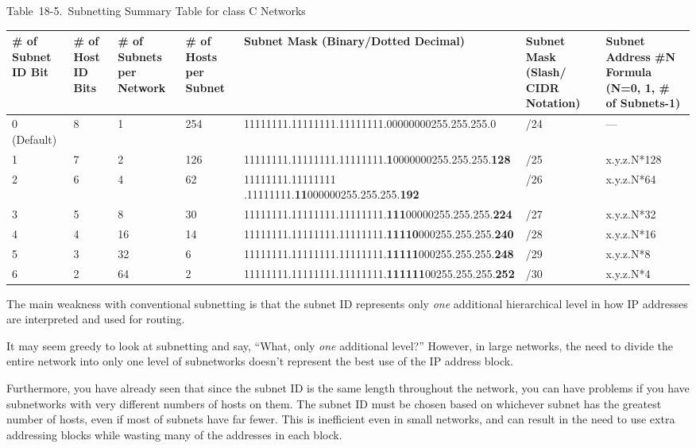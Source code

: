 \protect\hypertarget{ch18s07.htmlux5cux23subnetting_summary_table_for_class_c_net}{}{}

Table~18-5.~Subnetting Summary Table for class C Networks

\begin{longtable}[]{@{}lllllll@{}}
\toprule
\# of Subnet ID Bit & \# of Host ID Bits & \# of Subnets per Network &
\# of Hosts per Subnet & Subnet Mask (Binary/Dotted Decimal) & Subnet
Mask (Slash/ CIDR Notation) & Subnet Address \#N Formula (N=0, 1, \# of
Subnets-1)\tabularnewline
\midrule
\endhead
0 (Default) & 8 & 1 & 254 &
11111111.11111111.11111111.00000000255.255.255.0 & /24 &
---\tabularnewline
1 & 7 & 2 & 126 &
11111111.11111111.11111111.{\textbf{1}}0000000255.255.255.{\textbf{128}}
& /25 & x.y.z.N*128\tabularnewline
2 & 6 & 4 & 62 & 11111111.11111111
.11111111.{\textbf{11}}000000255.255.255.{\textbf{192}} & /26 &
x.y.z.N*64\tabularnewline
3 & 5 & 8 & 30 &
11111111.11111111.11111111.{\textbf{111}}00000255.255.255.{\textbf{224}}
& /27 & x.y.z.N*32\tabularnewline
4 & 4 & 16 & 14 &
11111111.11111111.11111111.{\textbf{11110}}000255.255.255.{\textbf{240}}
& /28 & x.y.z.N*16\tabularnewline
5 & 3 & 32 & 6 &
11111111.11111111.11111111.{\textbf{11111}}000255.255.255.{\textbf{248}}
& /29 & x.y.z.N*8\tabularnewline
6 & 2 & 64 & 2 &
11111111.11111111.11111111.{\textbf{111111}}00255.255.255.{\textbf{252}}
& /30 & x.y.z.N*4\tabularnewline
\bottomrule
\end{longtable}

\protect\hypertarget{ch18s08.html}{}{}

\protect\hypertarget{ch18s08.htmlux5cux23idx-CHP-18-0742}{}{}The main
weakness with conventional subnetting is that the subnet ID represents
only {\emph{one}} additional hierarchical level in how IP addresses are
interpreted and used for routing.

It may seem greedy to look at subnetting and say, ``What, only
{\emph{one}} additional level?'' However, in large networks, the need to
divide the entire network into only one level of subnetworks doesn't
represent the best use of the IP address block.

Furthermore, you have already seen that since the subnet ID is the same
length throughout the network, you can have problems if you have
subnetworks with very different numbers of hosts on them. The subnet ID
must be chosen based on whichever subnet has the greatest number of
hosts, even if most of subnets have far fewer. This is inefficient even
in small networks, and can result in the need to use extra addressing
blocks while wasting many of the addresses in each block.

